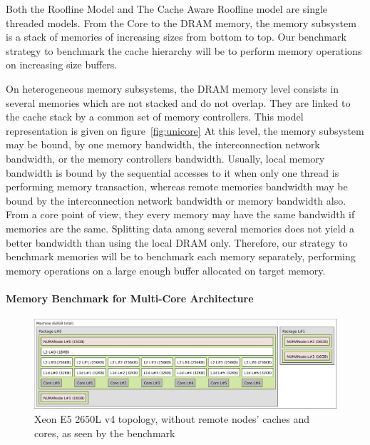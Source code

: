 \documentclass[twoside,twocolumn,8pt]{extarticle}
\begin{document}
Both the Roofline Model and The Cache Aware Roofline model are single threaded models.
From the Core to the DRAM memory, the memory subsystem is a stack of memories of increasing sizes from bottom to top.
Our benchmark strategy to benchmark the cache hierarchy will be to perform memory operations on increasing size buffers.

On heterogeneous memory subsystems, the DRAM memory level consists in several memories which are not stacked and do not
overlap. They are linked to the cache stack by a common set of memory controllers. This model representation is given on
figure~\ref{fig:unicore}
At this level, the memory subsystem may be bound, by one memory bandwidth, the interconnection network bandwidth,
or the memory controllers bandwidth.
Usually, local memory bandwidth is bound by the sequential accesses to it when only one thread is performing memory transaction,
whereas remote memories bandwidth may be bound by the interconnection network bandwidth or memory bandwidth also.
From a core point of view, they every memory may have the same bandwidth if memories are the same.
Splitting data among several memories does not yield a better bandwidth than using the local DRAM only.
Therefore, our strategy to benchmark memories will be to benchmark each memory separately, performing memory operations on a large
enough buffer allocated on target memory.

\paragraph{Memory Benchmark for Multi-Core Architecture}

\begin{figure}
  \centering
  \includegraphics[width=.9\textwidth]{pictures/Xeon_E5_2650L_v4}
  \caption{Xeon E5 2650L v4 topology, without remote nodes' caches and cores, as seen by the benchmark}
  \label{fig:joe0}
\end{figure}
\end{document}
